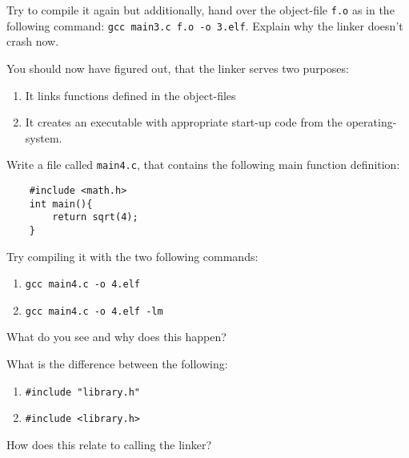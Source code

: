 \documentclass{dcbl/challenge}
\begin{document}
\begin{aufgabe}
    Try to compile it again but additionally, hand over the object-file \texttt{f.o} as in the following command: \texttt{gcc main3.c f.o -o 3.elf}.
    Explain why the linker doesn't crash now.
\end{aufgabe}

\begin{aufgabe}
    You should now have figured out, that the linker serves two purposes:
    \begin{enumerate}
        \item It links functions defined in the object-files
        \item It creates an executable with appropriate start-up code from the operating-system.
    \end{enumerate}
    Write a file called \texttt{main4.c}, that contains the following main function definition:
    \begin{lstlisting}
    #include <math.h>
    int main(){
        return sqrt(4);
    }
    \end{lstlisting}
    Try compiling it with the two following commands:
    \begin{enumerate}
        \item \texttt{gcc main4.c -o 4.elf}
        \item \texttt{gcc main4.c -o 4.elf -lm}
    \end{enumerate}
    What do you see and why does this happen?
\end{aufgabe}

\begin{aufgabe}
    What is the difference between the following:
    \begin{enumerate}
        \item \texttt{\#include "library.h"}
        \item \texttt{\#include <library.h>}
    \end{enumerate}
    How does this relate to calling the linker?
\end{aufgabe}
\end{document}
